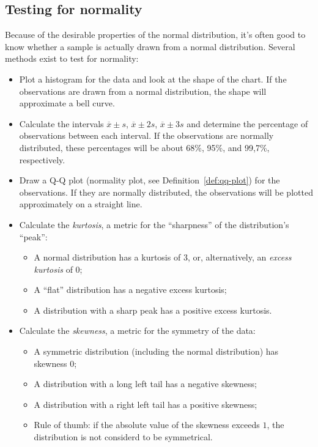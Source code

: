 \subsection{Testing for normality}
\label{ssec:testing-for-normality}

Because of the desirable properties of the normal distribution, it's often good to know whether a sample is actually drawn from a normal distribution. Several methods exist to test for normality:

\begin{itemize}
  \item Plot a histogram for the data and look at the shape of the chart. If the observations are drawn from a normal distribution, the shape will approximate a bell curve.
  
  \item Calculate the intervals $\overline{x} \pm s$, $\overline{x} \pm 2s$, $\overline{x} \pm 3s$ and determine the percentage of observations between each interval. If the observations are normally distributed, these percentages will be about 68\%, 95\%, and 99,7\%, respectively.
  
  \item Draw a Q-Q plot (normality plot, see Definition~\ref{def:qq-plot}) for the observations. If they are normally distributed, the observations will be plotted approximately on a straight line.
  
  \item Calculate the \emph{kurtosis}, a metric for the ``sharpness'' of the distribution's ``peak'':
  
    \begin{itemize}
      \item A normal distribution has a kurtosis of 3, or, alternatively, an \emph{excess kurtosis} of 0;
      \item A ``flat'' distribution has a negative excess kurtosis;
      \item A distribution with a sharp peak has a positive excess kurtosis.
    \end{itemize}
  
  \item Calculate the \emph{skewness}, a metric for the symmetry of the data:
  
    \begin{itemize}
      \item A symmetric distribution (including the normal distribution) has skewness 0;
      \item A distribution with a long left tail has a negative skewness;
      \item A distribution with a right left tail has a positive skewness;
      \item Rule of thumb: if the absolute value of the skewness exceeds $1$, the distribution is not considerd to be symmetrical.
    \end{itemize}
\end{itemize}

